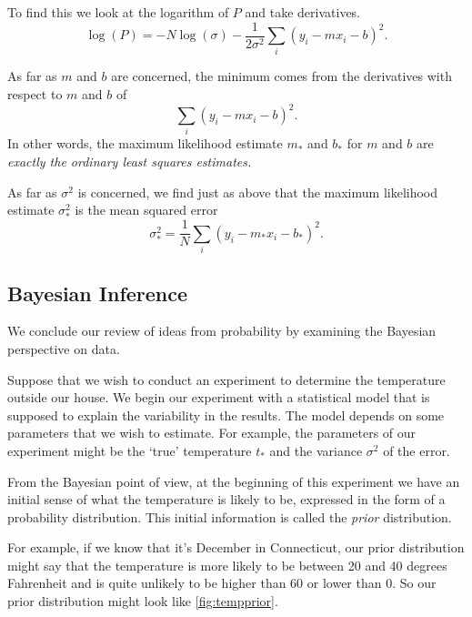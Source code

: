 \documentclass[
]{article}
\begin{document}
To find this we look at the logarithm of \(P\) and take derivatives. \[
\log(P) = -N\log(\sigma) -\frac{1}{2\sigma^2}\sum_{i}(y_i-mx_i-b)^2.
\]

As far as \(m\) and \(b\) are concerned, the minimum comes from the
derivatives with respect to \(m\) and \(b\) of \[
\sum_{i}(y_i-mx_i-b)^2.
\] In other words, the maximum likelihood estimate \(m_*\) and \(b_*\)
for \(m\) and \(b\) are \emph{exactly the ordinary least squares
estimates.}

As far as \(\sigma^2\) is concerned, we find just as above that the
maximum likelihood estimate \(\sigma^2_*\) is the mean squared error \[
\sigma^2_*=\frac{1}{N}\sum_{i}(y_i-m_*x_i-b_*)^2.
\]

\hypertarget{bayesian-inference}{%
\subsection{Bayesian Inference}\label{bayesian-inference}}

We conclude our review of ideas from probability by examining the
Bayesian perspective on data.

Suppose that we wish to conduct an experiment to determine the
temperature outside our house. We begin our experiment with a
statistical model that is supposed to explain the variability in the
results. The model depends on some parameters that we wish to estimate.
For example, the parameters of our experiment might be the `true'
temperature \(t_*\) and the variance \(\sigma^2\) of the error.

From the Bayesian point of view, at the beginning of this experiment we
have an initial sense of what the temperature is likely to be, expressed
in the form of a probability distribution. This initial information is
called the \emph{prior} distribution.

For example, if we know that it's December in Connecticut, our prior
distribution might say that the temperature is more likely to be between
20 and 40 degrees Fahrenheit and is quite unlikely to be higher than 60
or lower than 0. So our prior distribution might look like
\cref{fig:tempprior}.
\end{document}
